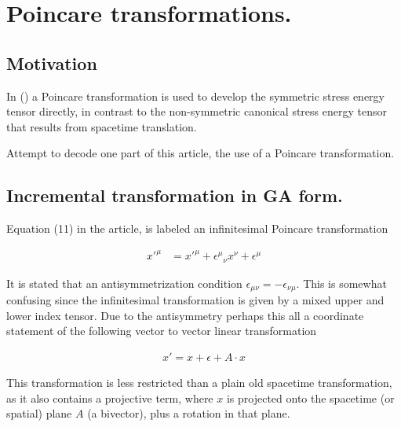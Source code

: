 %

\chapter{Poincare transformations.}
\label{chap:poincareTx}
\date{June 1, 2009.  poincareTx.tex}

\beginArtWithToc

\section{Motivation}

In (\citep{montesinos2006sem}) a Poincare transformation is used to develop the symmetric stress energy tensor directly, in contrast to the non-symmetric canonical stress energy tensor that results from spacetime translation.

Attempt to decode one part of this article, the use of a Poincare transformation.

\section{Incremental transformation in GA form.}

Equation (11) in the article, is labeled an infinitesimal Poincare transformation

\begin{align}\label{eqn:poincareTx:txComponents}
{x'}^\mu
&=
{x'}^\mu
+ {{\epsilon}^\mu}_\nu x^\nu
+ {\epsilon}^\mu
\end{align}

It is stated that an antisymmetrization condition $\epsilon_{\mu\nu} = -\epsilon_{\nu\mu}$.  This is somewhat confusing since the infinitesimal transformation is given by a mixed upper and lower index tensor.   Due to the antisymmetry perhaps this all a coordinate statement of the following vector to vector linear transformation 

\begin{align}\label{eqn:poincareTx:linearTxGuess}
x' = x + \epsilon + A \cdot x
\end{align}

This transformation is less restricted than a plain old spacetime transformation, as it also contains a projective term, where $x$ is projected onto the spacetime (or spatial) plane $A$ (a bivector), plus a rotation in that plane.


